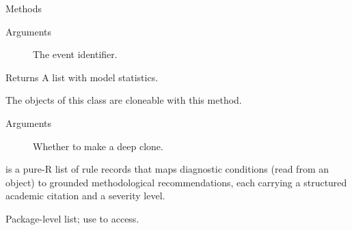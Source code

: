 \documentclass[a4paper]{book}
\begin{document}
\begin{Section}{Methods}
\begin{SubSection}{}
\begin{SubSubSection}{Arguments}
\begin{description}
\item[] The event identifier.

\end{description}



\end{SubSubSection}

%
\begin{SubSubSection}{Returns}
A list with model statistics.

\end{SubSubSection}

\end{SubSection}




\hypertarget{method-EventStudyTask-clone}{}
%
\begin{SubSection}{}
The objects of this class are cloneable with this method.
%

%
\begin{SubSubSection}{Arguments}

\begin{description}

\item[] Whether to make a deep clone.

\end{description}



\end{SubSubSection}

\end{SubSection}


\end{Section}
%
\begin{Description}
 is a pure-R list of rule records that maps diagnostic
conditions (read from an  object) to grounded
methodological recommendations, each carrying a structured academic citation
and a severity level.

Package-level list; use  to access.
\end{Description}
\end{document}
